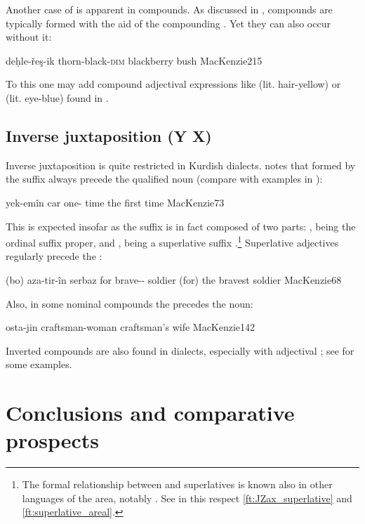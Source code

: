 Another case of  is apparent in compounds. As discussed in , compounds are typically formed with the aid of the {compounding \ez*}. Yet  they can also occur without it:

{deḥle-řeş-ik}
{thorn-black-\textsc{dim}}
{blackberry bush}
{MacKenzie}{215}

To this one may add compound adjectival expressions like  (lit. hair-yellow) or  (lit. eye-blue) found in .
	

\subsection{Inverse juxtaposition (Y X)} \label{ss:Kurd_inv_juxt}

Inverse {juxtaposition} is quite restricted in Kurdish dialects. \citet[73]{MacKenzie} notes that \Sor {} formed by the suffix  always precede the qualified noun (compare with examples in ):

{yek-emîn car}
{one-\ord{} time}
{the first time}
{MacKenzie}{73}

This is expected insofar as the suffix  is in fact composed of two parts: , being the ordinal suffix proper, and , being a superlative suffix \citep[68, \S 190.(b)]{MacKenzie}.\footnote{The formal relationship between  and superlatives is known also in other languages of the area, notably . \label{ft:superlative_ordinals} See in this respect \vref{ft:JZax_superlative} and \vref{ft:superlative_areal}.} Superlative adjectives regularly precede the :

{(bo) aza-tir-în serbaz}
{for brave-\compr-\supr{} soldier}
{(for) the bravest soldier}
{MacKenzie}{68}

Also, in some nominal compounds the \secn precedes the \prim noun:

{osta-jin}
{craftsman-woman}
{craftsman's wife}
{MacKenzie}{142}

Inverted compounds are also found in \Kur dialects, especially with adjectival \secns; see \citet[215]{MacKenzie} for some examples.

\section{Conclusions and comparative prospects}\label{ss:Kurd_conclusions}

